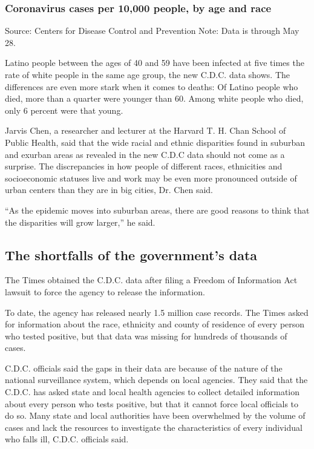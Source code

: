 \hypertarget{coronavirus-cases-per-10000-people-by-age-and-race}{%
\subsubsection{Coronavirus cases per 10,000 people, by age and
race}\label{coronavirus-cases-per-10000-people-by-age-and-race}}

Source: Centers for Disease Control and Prevention \textbar{} Note: Data
is through May 28.

Latino people between the ages of 40 and 59 have been infected at five
times the rate of white people in the same age group, the new C.D.C.
data shows. The differences are even more stark when it comes to deaths:
Of Latino people who died, more than a quarter were younger than 60.
Among white people who died, only 6 percent were that young.

Jarvis Chen, a researcher and lecturer at the Harvard T. H. Chan School
of Public Health, said that the wide racial and ethnic disparities found
in suburban and exurban areas as revealed in the new C.D.C data should
not come as a surprise. The discrepancies in how people of different
races, ethnicities and socioeconomic statuses live and work may be even
more pronounced outside of urban centers than they are in big cities,
Dr. Chen said.

``As the epidemic moves into suburban areas, there are good reasons to
think that the disparities will grow larger,'' he said.

\hypertarget{the-shortfalls-of-the-governments-data}{%
\subsection{The shortfalls of the government's
data}\label{the-shortfalls-of-the-governments-data}}

The Times obtained the C.D.C. data after filing a Freedom of Information
Act lawsuit to force the agency to release the information.

To date, the agency has released nearly 1.5 million case records. The
Times asked for information about the race, ethnicity and county of
residence of every person who tested positive, but that data was missing
for hundreds of thousands of cases.

C.D.C. officials said the gaps in their data are because of the nature
of the national surveillance system, which depends on local agencies.
They said that the C.D.C. has asked state and local health agencies to
collect detailed information about every person who tests positive, but
that it cannot force local officials to do so. Many state and local
authorities have been overwhelmed by the volume of cases and lack the
resources to investigate the characteristics of every individual who
falls ill, C.D.C. officials said.

